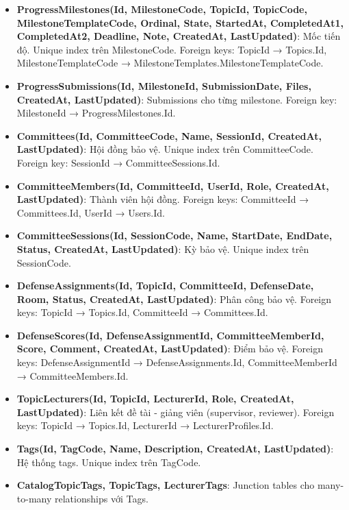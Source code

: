 \documentclass[conference,a4paper]{IEEEtran}
\begin{document}
\begin{itemize}
  \item \textbf{ProgressMilestones(Id, MilestoneCode, TopicId, TopicCode, MilestoneTemplateCode, Ordinal, State, StartedAt, CompletedAt1, CompletedAt2, Deadline, Note, CreatedAt, LastUpdated)}: Mốc tiến độ. Unique index trên MilestoneCode. Foreign keys: TopicId → Topics.Id, MilestoneTemplateCode → MilestoneTemplates.MilestoneTemplateCode.
  
  \item \textbf{ProgressSubmissions(Id, MilestoneId, SubmissionDate, Files, CreatedAt, LastUpdated)}: Submissions cho từng milestone. Foreign key: MilestoneId → ProgressMilestones.Id.
  
  \item \textbf{Committees(Id, CommitteeCode, Name, SessionId, CreatedAt, LastUpdated)}: Hội đồng bảo vệ. Unique index trên CommitteeCode. Foreign key: SessionId → CommitteeSessions.Id.
  
  \item \textbf{CommitteeMembers(Id, CommitteeId, UserId, Role, CreatedAt, LastUpdated)}: Thành viên hội đồng. Foreign keys: CommitteeId → Committees.Id, UserId → Users.Id.
  
  \item \textbf{CommitteeSessions(Id, SessionCode, Name, StartDate, EndDate, Status, CreatedAt, LastUpdated)}: Kỳ bảo vệ. Unique index trên SessionCode.
  
  \item \textbf{DefenseAssignments(Id, TopicId, CommitteeId, DefenseDate, Room, Status, CreatedAt, LastUpdated)}: Phân công bảo vệ. Foreign keys: TopicId → Topics.Id, CommitteeId → Committees.Id.
  
  \item \textbf{DefenseScores(Id, DefenseAssignmentId, CommitteeMemberId, Score, Comment, CreatedAt, LastUpdated)}: Điểm bảo vệ. Foreign keys: DefenseAssignmentId → DefenseAssignments.Id, CommitteeMemberId → CommitteeMembers.Id.
  
  \item \textbf{TopicLecturers(Id, TopicId, LecturerId, Role, CreatedAt, LastUpdated)}: Liên kết đề tài - giảng viên (supervisor, reviewer). Foreign keys: TopicId → Topics.Id, LecturerId → LecturerProfiles.Id.
  
  \item \textbf{Tags(Id, TagCode, Name, Description, CreatedAt, LastUpdated)}: Hệ thống tags. Unique index trên TagCode.
  
  \item \textbf{CatalogTopicTags, TopicTags, LecturerTags}: Junction tables cho many-to-many relationships với Tags.
  

\end{itemize}
\end{document}
